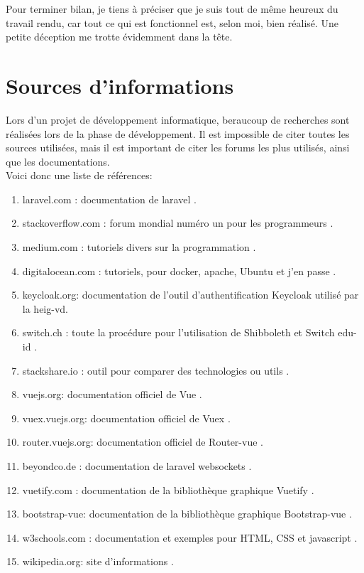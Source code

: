\documentclass[
    iai, %
    il, %
]{heig-tb}
\begin{document}
Pour terminer bilan, je tiens à préciser que je suis tout de même heureux du travail rendu, car tout ce qui est fonctionnel est, selon moi, bien réalisé. Une petite déception me trotte évidemment dans la tête.

\section{Sources d'informations}
Lors d'un projet de développement informatique, beraucoup de recherches sont réalisées lors de la
phase de développement. Il est impossible de citer toutes les sources utilisées, mais il est
important de citer les forums les plus utilisés, ainsi que les documentations.\\
Voici donc une liste de références:

\begin{enumerate}
    \item laravel.com : documentation de \Gls{laravel} \cite{laravel}.
    \item stackoverflow.com : forum mondial numéro un pour les programmeurs \cite{stackoverflow}.
    \item medium.com : tutoriels divers sur la programmation \cite{medium}.
    \item digitalocean.com : tutoriels, pour \Gls{docker}, \Gls{apache}, Ubuntu et j'en passe \cite{digitalocean}.
    \item keycloak.org: documentation de l'outil d'authentification Keycloak utilisé par la \Gls{heig-vd}.
    \item switch.ch : toute la procédure pour l’utilisation de Shibboleth et Switch edu-id \cite{switch}.
    \item stackshare.io : outil pour comparer des technologies ou utils \cite{stackshare}.
    \item vuejs.org: documentation officiel de Vue \cite{vuejs}.
    \item vuex.vuejs.org: documentation officiel de Vuex \cite{vuex}.
    \item router.vuejs.org: documentation officiel de Router-vue \cite{vue-router}.
    \item beyondco.de : documentation de \Gls{laravel} \Gls{websockets} \cite{beyondco}.
    \item vuetify.com : documentation de la bibliothèque graphique Vuetify \cite{vuetify}.
    \item bootstrap-vue: documentation de la bibliothèque graphique Bootstrap-vue \cite{bootstrap-vue}.
    \item w3schools.com : documentation et exemples pour HTML, CSS et \Gls{javascript} \cite{w3schools}.
    \item wikipedia.org: site d'informations \cite{wikipedia}.
\end{enumerate}
\end{document}

